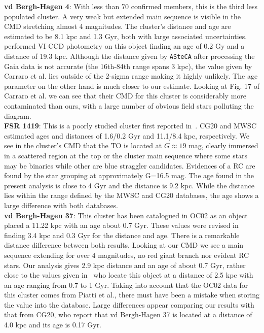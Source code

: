 \documentclass[draft]{aa}
\begin{document}
\begin{appendix}
  \noindent \textbf{vd Bergh-Hagen 4}: With less than 70 confirmed members, this is the
  third less populated cluster. A very weak but extended main sequence is
  visible in the CMD stretching almost 4 magnitudes.
  The cluster's distance and age are estimated to be 8.1 kpc and 1.3 Gyr,
  both with large associated uncertainties.
  \cite{Carraro_2007} performed VI CCD photometry on this object finding an
  age of 0.2 Gy and a distance of 19.3 kpc. Although the distance given by
  \texttt{ASteCA} after processing the Gaia data is not accurate (the 16th-84th
  range spans 3 kpc), the value given by Carraro et al. lies outside
  of the 2-sigma range making it highly unlikely. The age parameter on the other
  hand is much closer to our estimate.
  Looking at Fig. 17 of Carraro et al. we can see that their CMD for this
  cluster is considerably more contaminated than ours, with a large number of
  obvious field stars polluting the diagram.\\

  \noindent \textbf{FSR 1419}: This is a poorly studied cluster first reported
  in~\cite{Froebrich_2007}. CG20 and MWSC estimated ages and distances of
  1.6/0.2 Gyr and 11.1/8.4 kpc, respectively.
  We see in the cluster's  CMD that the TO is located at $G\approx19$ mag,
  clearly immersed in a scattered region at the top or the cluster main sequence
  where some stars may be binaries while other are blue straggler candidates.
  Evidences of a RC are found by the star grouping at approximately G=16.5 mag.
  The age found in the present analysis is close to 4 Gyr and the distance is
  9.2 kpc. While the distance lies within the range defined by the MWSC and CG20
  databases, the age shows a large difference with both databases.\\  

  \noindent \textbf{vd Bergh-Hagen 37}: This cluster has been catalogued in OC02
  as an object placed a 11.22 kpc with an age about 0.7 Gyr. These values were
  revised in~\cite{Dias_2021} finding 3.4 kpc and 0.3 Gyr for the distance and
  age. There is a remarkable distance difference between both results. 
  Looking at our CMD we see a main sequence extending for over 4 magnitudes, no
  red giant branch nor evident RC stars. Our analysis gives 2.9 kpc distance and
  an age of about 0.7 Gyr, rather close to the values given
  in~\cite{Piatti_2010} who locate this object at a distance of 2.5 kpc with an
  age ranging from 0.7 to 1 Gyr. Taking into account that the OC02 data for this
  cluster comes from Piatti et al., there must have been a mistake when storing
  the value into the database.
  Large differences appear comparing our results with that from CG20, who
  report that vd Bergh-Hagen 37 is located at a distance of 4.0 kpc and its age
  is 0.17 Gyr.\\


\end{appendix}
\end{document}
